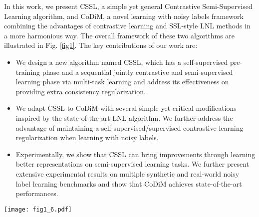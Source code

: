 \documentclass[letterpaper]{article} \usepackage{aaai22}  \usepackage{times}  \usepackage{helvet}  \usepackage{courier}  \usepackage[hyphens]{url}  \usepackage{graphicx} \usepackage{subfigure}
\begin{document}
In this work, we present CSSL, a simple yet general Contrastive Semi-Supervised Learning algorithm, and CoDiM, a novel learning with noisy labels framework combining the advantages of contrastive learning and SSL-style LNL methods in a more harmonious way. The overall framework of these two algorithms are illustrated in Fig. \ref{fig1}. The key contributions of our work are:
\begin{itemize}
    \item We design a new algorithm named CSSL, which has a self-supervised pre-training phase and a sequential jointly contrastive and semi-supervised learning phase via multi-task learning and address its effectiveness on providing extra consistency regularization. 
    \item We adapt CSSL to CoDiM with several simple yet critical modifications inspired by the state-of-the-art LNL algorithm. We further address the advantage of maintaining a self-supervised/supervised contrastive learning regularization when learning with noisy labels.  
    \item Experimentally, we show that CSSL can bring improvements through learning better representations on semi-supervised learning tasks. We further present extensive experimental results on multiple synthetic and real-world noisy label learning benchmarks and show that CoDiM achieves state-of-the-art performances.  
\end{itemize}

\begin{figure*}[t]
\centering
\texttt{[image: fig1\_6.pdf]}
\caption{The overall framework of CSSL and CoDiM. The former deals with a Semi-Supervised Learning (SSL) task where labels of the labeled set are assumed clean, while the latter is designed to handle a Learning with Noisy Labels (LNL) problem in which a part of training samples are mislabeled. In the first phase, both CSSL and CoDiM regard the whole training set as unlabeled and learn representations by self-supervised contrastive learning (SelfCon). In the second phase, CSSL employs SelfCon loss to the unlabeled set and SupCon loss to the labeled set along with a standard SSL algorithm; CoDiM splits a possibly clean set from the noisy set based on small-loss criterion, discards labels of the noisy set and then applies SSL in a similar manner like CSSL. Note only SupCon or SelfCon loss for the clean set is considered in CoDiM. For brevity, we omit augmentation strategies and regularization rules used in the second phase.}
\label{fig1}
\end{figure*}
\end{document}
